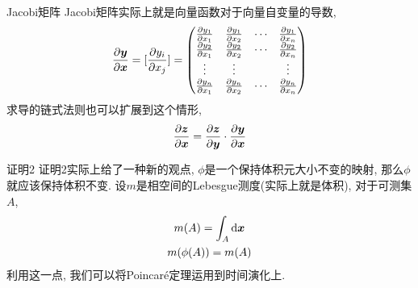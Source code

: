 \documentclass[aspectratio=169]{wzbeamer}
\begin{document}
    \begin{frame}{Jacobi矩阵}
        Jacobi矩阵实际上就是向量函数对于向量自变量的导数, 
        \begin{equation}
            \pdv{\vb*y}{\vb*x} = [\pdv{y_i}{x_j}] = 
            \begin{pmatrix}
                \pdv{y_1}{x_1} & \pdv{y_1}{x_2} & \cdots & \pdv{y_1}{x_n}\\
                \pdv{y_2}{x_1} & \pdv{y_2}{x_2} & \cdots & \pdv{y_2}{x_n}\\
                \vdots & \vdots & & \vdots\\
                \pdv{y_n}{x_1} & \pdv{y_n}{x_2} & \cdots & \pdv{y_n}{x_n}
            \end{pmatrix}
        \end{equation}
        求导的链式法则也可以扩展到这个情形,
        \begin{equation}
            \pdv{\vb*z}{\vb*x} = \pdv{\vb*z}{\vb*y} \cdot \pdv{\vb*y}{\vb*x}
        \end{equation}
    \end{frame}
    \begin{frame}{证明2}
        证明2实际上给了一种新的观点, $\phi$是一个保持体积元大小不变的映射, 那么$\phi$就应该保持体积不变. 设$m$是相空间的Lebesgue测度(实际上就是体积), 对于可测集$A$,
        \begin{gather}
            m(A) = \int_A \dd \vb*x\\
            m(\phi(A)) = m(A)
        \end{gather}
        利用这一点, 我们可以将Poincar\'e定理运用到时间演化上.
    \end{frame}
\end{document}
